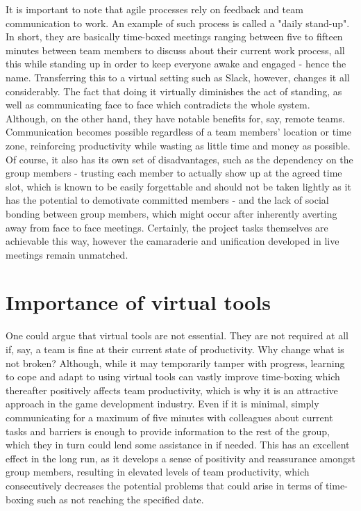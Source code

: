 \documentclass{scrartcl}
\begin{document}
It is important to note that agile processes rely on feedback and team communication to work\cite{Manifesto, Steve}. An example of such process is called a "daily stand-up". In short, they are basically time-boxed meetings ranging between five to fifteen minutes between team members to discuss about their current work process, all this while standing up in order to keep everyone awake and engaged - hence the name. Transferring this to a virtual setting such as Slack, however, changes it all considerably. The fact that doing it virtually diminishes the act of standing, as well as communicating face to face which contradicts the whole system. Although, on the other hand, they have notable benefits for, say, remote teams. Communication becomes possible regardless of a team members' location or time zone, reinforcing productivity while wasting as little time and money as possible. Of course, it also has its own set of disadvantages, such as the dependency on the group members - trusting each member to actually show up at the agreed time slot, which is known to be easily forgettable and should not be taken lightly as it has the potential to demotivate committed members - and the lack of social bonding between group members, which might occur after inherently averting away from face to face meetings. Certainly, the project tasks themselves are achievable this way, however the camaraderie and unification developed in live meetings remain unmatched.

\section{Importance of virtual tools}
One could argue that virtual tools are not essential. They are not required at all if, say, a team is fine at their current state of productivity. Why change what is not broken? Although, while it may temporarily tamper with progress, learning to cope and adapt to using virtual tools can vastly improve time-boxing which thereafter positively affects team productivity, which is why it is an attractive approach in the game development industry. Even if it is minimal, simply communicating for a maximum of five minutes with colleagues about current tasks and barriers is enough to provide information to the rest of the group, which they in turn could lend some assistance in if needed. This has an excellent effect in the long run, as it develops a sense of positivity and reassurance amongst group members, resulting in elevated levels of team productivity, which consecutively decreases the potential problems that could arise in terms of time-boxing such as not reaching the specified date.
\end{document}
